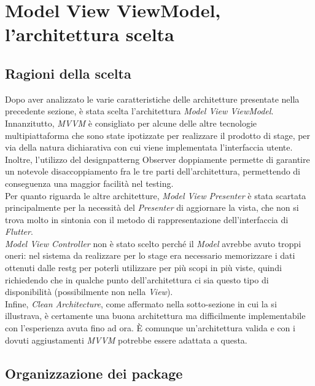 \section{Model View ViewModel, l'architettura scelta}
\label{sec:architettura-mvvm}

\subsection{Ragioni della scelta}
\label{subsec:ragioni-scelta}

Dopo aver analizzato le varie caratteristiche delle architetture presentate nella precedente sezione, è stata scelta l'architettura \emph{Model View ViewModel}.\\
Innanzitutto, \emph{MVVM} è consigliato per alcune delle altre tecnologie multipiattaforma che sono state ipotizzate per realizzare il prodotto di stage, per via della natura dichiarativa con cui viene implementata l'interfaccia utente.
Inoltre, l'utilizzo del \gls{designpatterng} Observer doppiamente permette di garantire un notevole disaccoppiamento fra le tre parti dell'architettura, permettendo di conseguenza una maggior facilità nel testing.\\
Per quanto riguarda le altre architetture, \emph{Model View Presenter} è stata scartata principalmente per la necessità del \emph{Presenter} di aggiornare la vista, che non si trova molto in sintonia con il metodo di rappresentazione dell'interfaccia di \emph{Flutter}.\\
\emph{Model View Controller} non è stato scelto perché il \emph{Model} avrebbe avuto troppi oneri: nel sistema da realizzare per lo stage era necessario memorizzare i dati ottenuti dalle \gls{restg} per poterli utilizzare per più scopi in più viste, quindi richiedendo che in qualche punto dell'architettura ci sia questo tipo di disponibilità (possibilmente non nella \emph{View}).\\
Infine, \emph{Clean Architecture}, come affermato nella sotto-sezione in cui la si illustrava, è certamente una buona architettura ma difficilmente implementabile con l'esperienza avuta fino ad ora. È comunque un'architettura valida e con i dovuti aggiustamenti \emph{MVVM} potrebbe essere adattata a questa.

\subsection{Organizzazione dei package}
\label{subsec:organizzazione-package}

